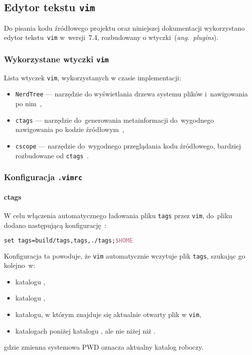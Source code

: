 \documentclass[thesis]{subfiles}
\begin{document}
\subsection{Edytor tekstu \texttt{vim}}

Do pisania kodu źródłowego projektu oraz niniejszej dokumentacji wykorzystano edytor tekstu~\texttt{vim} w~wersji~7.4, rozbudowany o wtyczki~(\emph{ang.~plugins}).

\subsubsection{Wykorzystane wtyczki \texttt{vim}}

Lista wtyczek \texttt{vim}, wykorzystanych w czasie implementacji:
\begin{itemize}
	\item\texttt{NerdTree} --- narzędzie do wyświetlania drzewa systemu plików i~nawigowania po nim~\cite{nerdtree-vimorg,nerdtree-github},
	\item\texttt{ctags} --- narzędzie do~generowania metainformacji do~wygodnego nawigowania po kodzie źródłowym~\cite{ctags},
	\item\texttt{cscope} --- narzędzie do~wygodnego przeglądania kodu źródłowego, bardziej rozbudowane od \texttt{ctags}~\cite{cscope}.
\end{itemize}

\subsubsection{Konfiguracja \texttt{.vimrc}}


\paragraph{ctags}

W celu włączenia automatycznego ładowania pliku \texttt{tags} przez \texttt{vim}, do~pliku \mbox{} dodano następującą konfigurację~\cite{ctags,ctags-tricks}:
\begin{lstlisting}[language=tex,numbers=none,caption={Konfiguracja \texttt{ctags} w~\texttt{.vimrc}}]
set tags=build/tags,tags,./tags;$HOME
\end{lstlisting}
Konfiguracja ta powoduje, że \texttt{vim} automatycznie wczytuje plik \texttt{tags}, szukając go kolejno~w:
\begin{itemize}[font=\ttfamily]
	\item katalogu ,
	\item katalogu ,
	\item katalogu, w którym znajduje się aktualnie otwarty plik w \texttt{vim},
	\item katalogach poniżej katalogu , ale nie niżej niż .
\end{itemize}
gdzie zmienna systemowa \gls{PWD} oznacza aktualny katalog roboczy.
\end{document}
